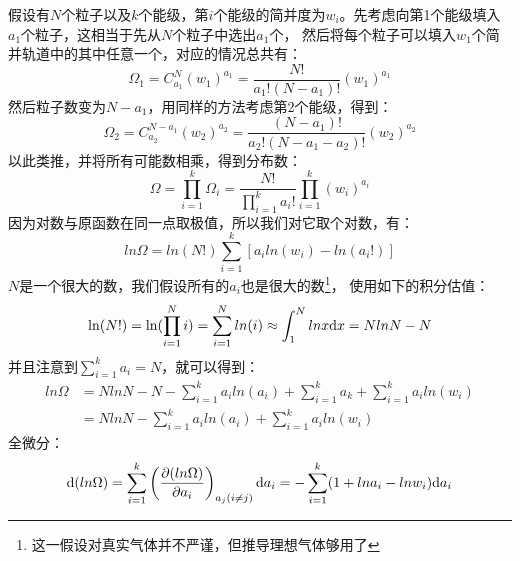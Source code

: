 \begin{prove}
            假设有$N$个粒子以及$k$个能级，第$i$个能级的简并度为$w_i$。先考虑向第1个能级填入$a_1$个粒子，这相当于先从$N$个粒子中选出$a_1$个，
            然后将每个粒子可以填入$w_1$个简并轨道中的其中任意一个，对应的情况总共有：
            \begin{equation}
                \Omega_1 =C_{a_1}^{N} (w_1)^{a_1} = \frac{N!}{a_{1}!(N-a_{1})!} (w_1)^{a_1}
            \end{equation}
            然后粒子数变为$N-a_1$，用同样的方法考虑第2个能级，得到：
            \begin{equation}
                \Omega_2 =C_{a_2}^{N-a_1} (w_2)^{a_2} = \frac{(N-a_1)!}{a_{2}!(N-a_{1}-a_{2})!} (w_2)^{a_2}
            \end{equation}
            以此类推，并将所有可能数相乘，得到分布数：
            \begin{equation}
                \Omega = \prod_{i=1}^{k} \Omega_{i} = \frac{N!}{\prod_{i = 1}^{k}a_{i}!}\prod_{i = 1}^{k} (w_i)^{a_i}
            \end{equation}
            因为对数与原函数在同一点取极值，所以我们对它取个对数，有：
            \begin{equation}
                ln\Omega = ln(N!)\sum_{i = 1}^{k}[{a_i}ln(w_i) - ln(a_i!)]
            \end{equation}
            $N$是一个很大的数，我们假设所有的$a_i$也是很大的数\footnote{这一假设对真实气体并不严谨，但推导理想气体够用了}，
            使用如下的积分估值：
            \begin{equation}
                \ln(N!) = \ln(\prod_{i=1}^{N}i)=\sum_{i=1}^{N}ln(i) \approx \int_{1}^{N}lnx\mathrm{d}{x} = NlnN-N
            \end{equation}
            并且注意到$\sum_{i=1}^{k}a_i=N$，就可以得到：
            \begin{equation}
                \begin{aligned}
                    ln\Omega &= NlnN-N-\sum_{i=1}^{k}a_{i}ln(a_i)+\sum_{i=1}^{k}a_k+\sum_{i = 1}^{k}{a_i}ln(w_i)\\
                    &=NlnN-\sum_{i=1}^{k}a_{i}ln(a_i)+\sum_{i = 1}^{k}{a_i}ln(w_i)
                    \label{of_omega}
                \end{aligned}
            \end{equation}
            全微分：
            \begin{equation}
                \dif{(ln\Omega)} = \sum_{i=1}^{k}\left(\frac{\partial (ln\Omega)}{\partial a_i}\right)_{a_j(i\neq j)} \dif{a_i} = 
                -\sum_{i=1}^{k}(1+ln a_i-ln w_i)\dif{a_i} 

\end{equation}
\end{prove}
